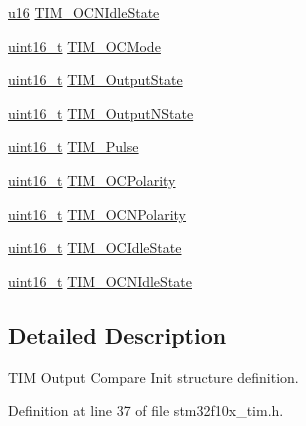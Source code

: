 \begin{DoxyCompactItemize}
\item 
\hyperlink{agilefox_2library_2inc_2stm32f10x__type_8h_a9e6c91d77e24643b888dbd1a1a590054}{u16} \hyperlink{struct_t_i_m___o_c_init_type_def_a9c1eab3bbc010aa2c14343fea21fb851}{T\+I\+M\+\_\+\+O\+C\+N\+Idle\+State}
\item 
\hyperlink{_p_e___types_8h_a1f1825b69244eb3ad2c7165ddc99c956}{uint16\+\_\+t} \hyperlink{struct_t_i_m___o_c_init_type_def_ad4338ed2415b0d6d19589bf72b7ba3b0}{T\+I\+M\+\_\+\+O\+C\+Mode}
\item 
\hyperlink{_p_e___types_8h_a1f1825b69244eb3ad2c7165ddc99c956}{uint16\+\_\+t} \hyperlink{struct_t_i_m___o_c_init_type_def_a2baca9c02d214d3125635a74e8d9aee4}{T\+I\+M\+\_\+\+Output\+State}
\item 
\hyperlink{_p_e___types_8h_a1f1825b69244eb3ad2c7165ddc99c956}{uint16\+\_\+t} \hyperlink{struct_t_i_m___o_c_init_type_def_a933904d2f892d0b945a908b9257fe869}{T\+I\+M\+\_\+\+Output\+N\+State}
\item 
\hyperlink{_p_e___types_8h_a1f1825b69244eb3ad2c7165ddc99c956}{uint16\+\_\+t} \hyperlink{struct_t_i_m___o_c_init_type_def_a186a3729af4e52f73f96590d805412a3}{T\+I\+M\+\_\+\+Pulse}
\item 
\hyperlink{_p_e___types_8h_a1f1825b69244eb3ad2c7165ddc99c956}{uint16\+\_\+t} \hyperlink{struct_t_i_m___o_c_init_type_def_a9ed3e2de4700d008729a916d8ba78486}{T\+I\+M\+\_\+\+O\+C\+Polarity}
\item 
\hyperlink{_p_e___types_8h_a1f1825b69244eb3ad2c7165ddc99c956}{uint16\+\_\+t} \hyperlink{struct_t_i_m___o_c_init_type_def_a3e47e672810747302c9d0626ae2ccb17}{T\+I\+M\+\_\+\+O\+C\+N\+Polarity}
\item 
\hyperlink{_p_e___types_8h_a1f1825b69244eb3ad2c7165ddc99c956}{uint16\+\_\+t} \hyperlink{struct_t_i_m___o_c_init_type_def_a2a28f2d62339e06caef12816e04a8f55}{T\+I\+M\+\_\+\+O\+C\+Idle\+State}
\item 
\hyperlink{_p_e___types_8h_a1f1825b69244eb3ad2c7165ddc99c956}{uint16\+\_\+t} \hyperlink{struct_t_i_m___o_c_init_type_def_a6cbbe6eb87c2ab49e4d68fa9703ce949}{T\+I\+M\+\_\+\+O\+C\+N\+Idle\+State}
\end{DoxyCompactItemize}


\subsection{Detailed Description}
T\+IM Output Compare Init structure definition. 

Definition at line 37 of file stm32f10x\+\_\+tim.\+h.



